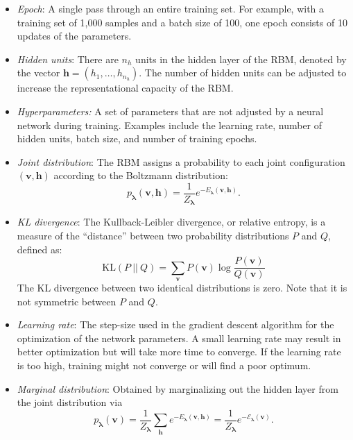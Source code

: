 \documentclass[submission, Phys, hidelnks]{SciPost}
\begin{document}
\begin{itemize}
\item \textit{Epoch}: A single pass through an entire training set. For example,
with a training set of 1,000 samples and a batch size of 100, one epoch consists
of 10 updates of the parameters.

\item \textit{Hidden units}: There are $n_h$ units in the hidden layer of the
RBM, denoted by the vector $\bm{h}=(h_1, \ldots, h_{n_h})$. The number of
hidden units can be adjusted to increase the representational capacity of
the RBM.\@

\item \textit{Hyperparameters:} A set of parameters that are not adjusted by a
neural network during training. Examples include the learning rate, number of
hidden units, batch size, and number of training epochs.

\item \textit{Joint distribution}: The RBM assigns a probability to each joint
configuration $(\bm v, \bm h)$ according to the Boltzmann distribution:
\begin{equation}
   p_{\bm{\lambda}}(\bm{v},\bm{h}) = \frac{1}{Z_{\bm{\lambda}}} e^{-E_{\bm{\lambda}}(\bm{v},\bm{h})}.
\end{equation}

\item \textit{KL divergence}: The Kullback-Leibler divergence, or relative
entropy, is a measure of the ``distance'' between two probability distributions
$P$ and $Q$, defined as:
\begin{equation}
\mathrm{KL}(P\:||\:Q)=\sum_{\bm{v}}P(\bm{v})\log\frac{P(\bm{v})}{Q(\bm{v})}
\end{equation}
The KL divergence between two identical distributions is zero.
Note that it is not symmetric between $P$ and $Q$.

\item \textit{Learning rate}: The step-size used in the gradient descent
algorithm for the optimization of the network parameters. A small learning rate
may result in better optimization but will take more time to converge. If the
learning rate is too high, training might not converge or will find a poor optimum.

\item \textit{Marginal distribution}: Obtained by marginalizing out the hidden layer from the joint distribution via
\begin{equation}\label{Eq:marginal_distribution}
   p_{\bm{\lambda}}(\bm{v}) = \frac{1}{Z_{\bm{\lambda}}} \sum_{\bm{h}} e^{-E_{\bm{\lambda}}(\bm{v},\bm{h})} = \frac{1}{Z_{\bm{\lambda}}} e^{- \mathcal{E}_{\bm{\lambda}}(\bm{v})}.
\end{equation}


\end{itemize}
\end{document}
